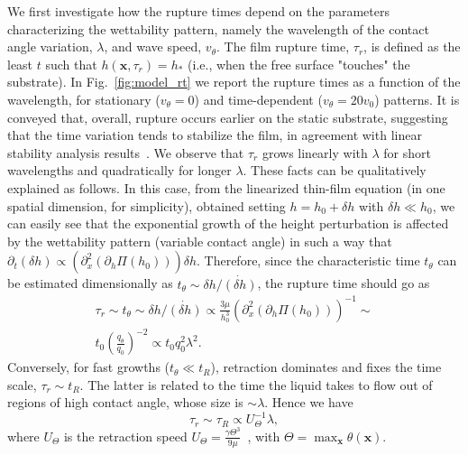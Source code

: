 \documentclass[twocolumn,amsmath,amssymb,showpacs,prl,superscriptaddress]{revtex4-1} %
\begin{document}
 We first investigate how the rupture times depend on the parameters characterizing the wettability pattern, namely the wavelength of the contact angle variation, $\lambda$, and wave speed, $v_{\theta}$.
The film rupture time, $\tau_r$, is defined as the least $t$ such that $h(\mathbf{x},\tau_r)=h_{\ast}$ (i.e., when the free surface "touches" the substrate).
In Fig.~\ref{fig:model_rt} we report the rupture times as a function of the wavelength, for stationary ($v_{\theta}=0$) and time-dependent ($v_{\theta}=20 v_0$) patterns. 
It is conveyed that, overall, rupture occurs earlier on the static substrate, suggesting that the time variation tends to stabilize the film, in agreement with linear stability analysis results~\cite{suman2006dynamics}.
We observe that $\tau_r$ grows linearly with $\lambda$ for short wavelengths and quadratically for longer $\lambda$.
These facts can be qualitatively explained as follows. 
In this case, from the linearized thin-film equation (in one spatial dimension, for simplicity), obtained setting $h=h_0 + \delta h$ with $\delta h \ll h_0$, 
we can easily see that the exponential growth of the height perturbation is affected by the wettability pattern (variable contact angle) in such a way that $\partial_t (\delta h) \propto (\partial_x^2 (\partial_h\Pi(h_0))) \delta h$. Therefore, since the characteristic time $t_{\theta}$ can be estimated dimensionally as $t_{\theta} \sim \delta h/\dot{(\delta h)}$, the rupture time should go as
\begin{multline}\label{eq:taur_l2}
    \tau_r \sim t_{\theta} \sim  \delta h/\dot{(\delta h)} \propto \frac{3\mu}{h_0^3}(\partial_x^2 (\partial_h\Pi (h_0)))^{-1} \sim \\
    t_0 \left(\frac{q_{\theta}}{q_0}\right)^{-2} \propto t_0 q_0^2 \lambda^2.
\end{multline}
Conversely, for fast growths ($t_{\theta} \ll t_R$), retraction dominates and fixes the time scale, $\tau_r \sim t_R$. 
The latter is related to the time the liquid takes to flow out of regions of high contact angle, whose size is $\sim \lambda$. Hence we have 
\begin{equation}\label{eq:taur_l1}
 \tau_r \sim \tau_R \propto U_{\Theta}^{-1}\lambda,
\end{equation}
where $U_{\Theta}$ is the retraction speed $U_{\Theta} = \frac{\gamma \Theta^3}{9\mu}$~\cite{Edwards2016}, with $\Theta = \max_{\mathbf{x}}\theta(\mathbf{x})$.
\end{document}
